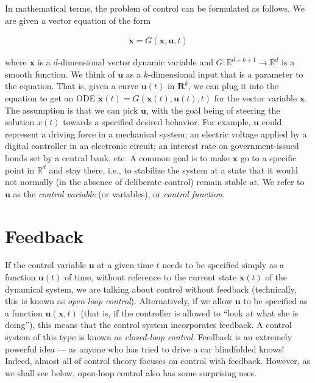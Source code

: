 \documentclass[11pt]{report}
\newcommand{\R}{\mathbb{R}}
\theoremstyle{plain}
\theoremstyle{definition}
\begin{document}
In mathematical terms, the problem of control can be
formulated as follows. We are given a vector equation
of the form

\begin{align*}
\dot{\mathbf{x}} = G(\mathbf{x},\mathbf{u},t)
\end{align*}

\noindent where $\mathbf{x}$ is a $d$-dimensional vector dynamic
variable and $G:\mathbb{R}^{d+k+1}\to\R^d$ is a smooth
function. We think of $\mathbf{u}$ as a
$k$-dimensional input that is a parameter to the
equation. That is, given a curve $\mathbf{u}(t)$ in
$\mathbf{R}^k$, we can plug it into the equation to
get an ODE
$\dot{\mathbf{x}}(t) =
G(\mathbf{x}(t),\mathbf{u}(t),t)$
for the vector variable $\mathbf{x}$. The assumption
is that we can pick $\mathbf{u}$, with the goal being
of steering the solution $x(t)$ towards a specified
desired behavior. For example, $\mathbf{u}$ could
represent a driving force in a mechanical system; an
electric voltage applied by a digital controller in an
electronic circuit; an interest rate on
government-issued bonds set by a central bank, etc. A
common goal is to make $\mathbf{x}$ go to a specific
point in $\mathbb{R}^d$ and stay there, i.e., to
stabilize the system at a state that it would not
normally (in the absence of deliberate control) remain
stable at. We refer to $\mathbf{u}$ as the \emph{control
variable} (or variables), or \emph{control function}.

\section{Feedback}

If the control variable $\mathbf{u}$ at a given time
$t$ needs to be specified simply as a function
$\mathbf{u}(t)$ of time, without reference to the
current state $\mathbf{x}(t)$ of the dynamical system,
we are talking about control without feedback
(technically, this is known as \emph{open-loop control}).
Alternatively, if we allow $\mathbf{u}$ to be
specified as a function $\mathbf{u}(\mathbf{x},t)$
(that is, if the controller is allowed to ``look at
what she is doing''), this means that the control
system incorporates feedback. A control system of this
type is known as \emph{closed-loop control}. Feedback is an
extremely powerful idea --- as anyone who has tried to
drive a car blindfolded knows! Indeed, almost all of
control theory focuses on control with feedback.
However, as we shall see below, open-loop control also
has some surprising uses.
\end{document}
